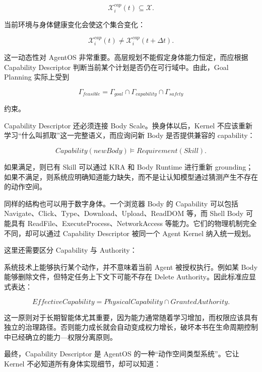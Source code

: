 \[
\mathcal X_i^{cap}(t)
\subseteq
\mathcal X.
\]

当前环境与身体健康变化会使这个集合变化：

\[
\mathcal X_i^{cap}(t)
\neq
\mathcal X_i^{cap}(t+\Delta t).
\]

这一动态性对 AgentOS 非常重要。高层规划不能假定身体能力恒定，而应根据 Capability Descriptor 判断当前某个计划是否仍在可行域中。由此，Goal Planning 实际上受到

\[
\Gamma_{feasible}
=
\Gamma_{goal}
\cap
\Gamma_{capability}
\cap
\Gamma_{safety}
\]

约束。

Capability Descriptor 还必须连接 Body Scale。换身体以后，Kernel 不应该重新学习``什么叫抓取''这一完整语义，而应询问新 Body 是否提供兼容的 capability：

\[
Capability(newBody)
\models
Requirement(Skill).
\]

如果满足，则已有 Skill 可以通过 KRA 和 Body Runtime 进行重新 grounding；如果不满足，则系统应明确知道能力缺失，而不是让认知模型通过猜测产生不存在的动作空间。

同样的结构也可以用于数字身体。一个浏览器 Body 的 Capability 可以包括 Navigate、Click、Type、Download、Upload、ReadDOM 等，而 Shell Body 可能具有 ReadFile、ExecuteProcess、NetworkAccess 等能力。它们的物理机制完全不同，却可以通过 Capability Descriptor 被同一个 Agent Kernel 纳入统一规划。

这里还需要区分 Capability 与 Authority：

\begin{statementbox}
\centering
{}
\end{statementbox}

系统技术上能够执行某个动作，并不意味着当前 Agent 被授权执行。例如某 Body 能够删除文件，但特定任务上下文下可能不存在 Delete Authority。因此标准应显式表达：

\[
EffectiveCapability
=
PhysicalCapability
\cap
GrantedAuthority.
\]

这一原则对于长期智能体尤其重要，因为能力通常随着学习增加，而权限应该具有独立的治理路径。否则能力成长就会自动变成权力增长，破坏本书在生命周期控制中已经确立的能力---权限分离原则。

最终，Capability Descriptor 是 AgentOS 的一种``动作空间类型系统''。它让 Kernel 不必知道所有身体实现细节，却可以知道：

\begin{statementbox}
\centering
{}
\end{statementbox}

